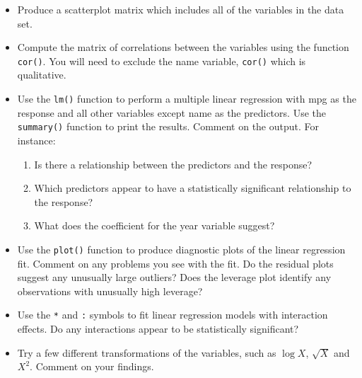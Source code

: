 \documentclass[11pt]{scrartcl}
\begin{document}
\begin{itemize}
\item Produce a scatterplot matrix which includes all of the variables in the data
set.
\item Compute the matrix of correlations between the variables using the function
\texttt{cor()}. You will need to exclude the name variable, \texttt{cor()} which is
qualitative.
\item Use the \texttt{lm()} function to perform a multiple linear regression with mpg as
the response and all other variables except name as the predictors. Use the
\texttt{summary()} function to print the results. Comment on the output. For
instance:
\begin{enumerate}
\item Is there a relationship between the predictors and the response?
\item Which predictors appear to have a statistically signiﬁcant relationship to
the response?
\item What does the coeﬃcient for the year variable suggest?
\end{enumerate}
\item Use the \texttt{plot()} function to produce diagnostic plots of the linear regression
ﬁt. Comment on any problems you see with the ﬁt. Do the residual plots suggest
any unusually large outliers? Does the leverage plot identify any observations
with unusually high leverage?
\item Use the \texttt{*} and \texttt{:} symbols to ﬁt linear regression models with interaction
eﬀects. Do any interactions appear to be statistically signiﬁcant?
\item Try a few diﬀerent transformations of the variables, such as \(\log{X}\),
\(\sqrt{X}\) and \(X^{2}\). Comment on your findings.
\end{itemize}
\end{document}
